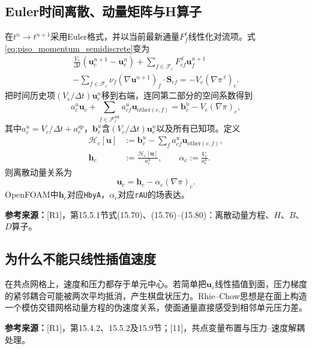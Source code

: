 \documentclass[UTF8,12pt,a4paper]{ctexart}
\numberwithin{equation}{section}
\newcommand{\dt}{\Delta t}
\newcommand{\Jasak}{\textnormal{[11]}}
\newcommand{\Rone}{\textnormal{[R1]}}
\newcommand{\source}[1]{\par\smallskip\noindent\colorbox{sourcebg}{%
  \parbox{0.955\linewidth}{\footnotesize\color{sourcegray}\textbf{参考来源：}#1}}\par\smallskip}
\begin{document}
\subsection{Euler时间离散、动量矩阵与H算子}
在$t^n\to t^{n+1}$采用Euler格式，并以当前最新通量$F_f^{\ell}$线性化对流项。式\eqref{eq:piso_momentum_semidiscrete}变为
\begin{multline}
  \frac{V_c}{\dt}(\bm u_c^{n+1}-\bm u_c^n)
  +\sum_{f\in\mathcal F_c}F_{cf}^{\,\ell}\bm u_f^{n+1}\\
  -\sum_{f\in\mathcal F_c}\nu_f(\nabla\bm u^{n+1})_f\cdot\bm S_{cf}
  =-V_c(\nabla\pi^{\,\ell})_c.
  \label{eq:momentum_fvm}
\end{multline}
把时间历史项$(V_c/\dt)\bm u_c^n$移到右端，连同第二部分的空间系数得到
\begin{equation}
  \boxed{a_c^u\bm u_c+
  \sum_{f\in\mathcal F_c^{\mathrm{int}}}a_{cf}^u
  \bm u_{\mathrm{other}(c,f)}
  =\bm b_c^u-V_c(\nabla\pi)_c,}
  \label{eq:piso_time_matrix}
\end{equation}
其中$a_c^u=V_c/\dt+a_c^{\mathrm{sp}}$，$\bm b_c^u$含$(V_c/\dt)\bm u_c^n$以及所有已知项。定义
\begin{align}
  \mathcal H_c[\bm u]
  &:=\bm b_c^u-\sum_fa_{cf}^u\bm u_{\mathrm{other}(c,f)},\\
  \bm h_c&:=\frac{\mathcal H_c[\bm u]}{a_c^u},\qquad
  \alpha_c:=\frac{V_c}{a_c^u}.
  \label{eq:H_alpha}
\end{align}
则离散动量关系为
\begin{equation}
  \boxed{\bm u_c=\bm h_c-\alpha_c(\nabla\pi)_c.}
  \label{eq:velocity_H}
\end{equation}
OpenFOAM中$\bm h_c$对应\texttt{HbyA}，$\alpha_c$对应\texttt{rAU}的场表达。
\source{\Rone，第15.5.1节式(15.70)、(15.76)--(15.80)：离散动量方程、$H$、$B$、$D$算子。}

\subsection{为什么不能只线性插值速度}
在共点网格上，速度和压力都存于单元中心。若简单把$\bm u_c$线性插值到面，压力梯度的紧邻耦合可能被两次平均抵消，产生棋盘状压力。Rhie--Chow思想是在面上构造一个模仿交错网格动量方程的伪速度关系，使面通量直接感受到相邻单元压力差。
\source{\Rone，第15.4.2、15.5.2及15.9节；\Jasak，共点变量布置与压力--速度解耦处理。}
\end{document}
